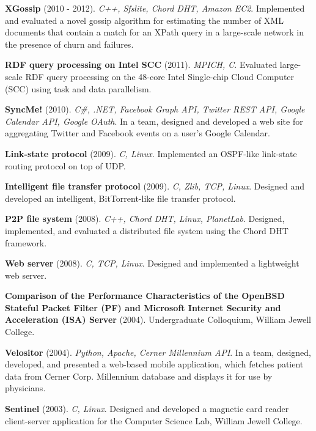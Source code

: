 \documentclass[margin,line]{resume}
\begin{document}
\begin{resume}
    \textbf{XGossip} (2010 - 2012). \textsl{C++, Sfslite, Chord DHT, Amazon EC2}. Implemented and evaluated a novel gossip algorithm for estimating the number of XML documents that contain a match for an XPath query in a large-scale network in the presence of churn and failures.

\vspace{-2mm}
    \textbf{RDF query processing on Intel SCC} (2011). \textsl{MPICH, C}. Evaluated large-scale RDF query processing on the 48-core Intel Single-chip Cloud Computer (SCC) using task and data parallelism.
    
\vspace{-2mm}
    \textbf{SyncMe!} (2010). \textsl{C\#, .NET, Facebook Graph API, Twitter REST API, Google Calendar API, Google OAuth}. In a team, designed and developed a web site for aggregating Twitter and Facebook events on a user's Google Calendar.

\vspace{-2mm}
    \textbf{Link-state protocol} (2009). \textsl{C, Linux}. Implemented an OSPF-like link-state routing protocol on top of UDP.

\vspace{-2mm}
    \textbf{Intelligent file transfer protocol} (2009). \textsl{C, Zlib, TCP, Linux}. Designed and developed an intelligent, BitTorrent-like file transfer protocol.

\vspace{-2mm}
    \textbf{P2P file system} (2008). \textsl{C++, Chord DHT, Linux, PlanetLab}. Designed, implemented, and evaluated a distributed file system using the Chord DHT framework.

\vspace{-2mm}
    \textbf{Web server} (2008). \textsl{C, TCP, Linux}. Designed and implemented a lightweight web server.
    
\vspace{-2mm}
    \textbf{Comparison of the Performance Characteristics of the OpenBSD Stateful Packet Filter (PF) and Microsoft Internet Security and Acceleration (ISA) Server} (2004). Undergraduate Colloquium, William Jewell College.

\vspace{-2mm}    
    \textbf{Velositor} (2004). \textsl{Python, Apache, Cerner Millennium API}. In a team, designed, developed, and presented a web-based mobile application, which fetches patient data from Cerner Corp. Millennium database and displays it for use by physicians.

\vspace{-2mm}
    \textbf{Sentinel} (2003). \textsl{C, Linux}. Designed and developed a magnetic card reader client-server application for the Computer Science Lab, William Jewell College.
    

\end{resume}
\end{document}
